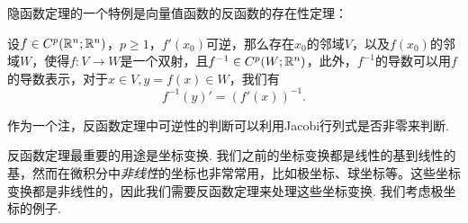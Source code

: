 隐函数定理的一个特例是向量值函数的反函数的存在性定理：

\begin{theorem}[反函数定理]\label{thm:inverse-function}
    设$f\in C^p(\mathbb{R}^n;\mathbb{R}^n)$，$p\geq 1$，$f'(x_0)$可逆，那么存在$x_0$的邻域$V$，以及$f(x_0)$的邻域$W$，使得$f:V\to W$是一个双射，且$f^{-1}\in C^p(W;\mathbb{R}^n)$，此外，$f^{-1}$的导数可以用$f$的导数表示，对于$x\in V,y=f(x)\in W$，我们有
    \[f^{-1}(y)'=(f'(x))^{-1}.\]
\end{theorem}

作为一个注，反函数定理中可逆性的判断可以利用Jacobi行列式是否非零来判断. 

反函数定理最重要的用途是坐标变换. 我们之前的坐标变换都是线性的基到线性的基，然而在微积分中\emph{非线性}的坐标也非常常用，比如极坐标、球坐标等。这些坐标变换都是非线性的，因此我们需要反函数定理来处理这些坐标变换. 我们考虑极坐标的例子. 


